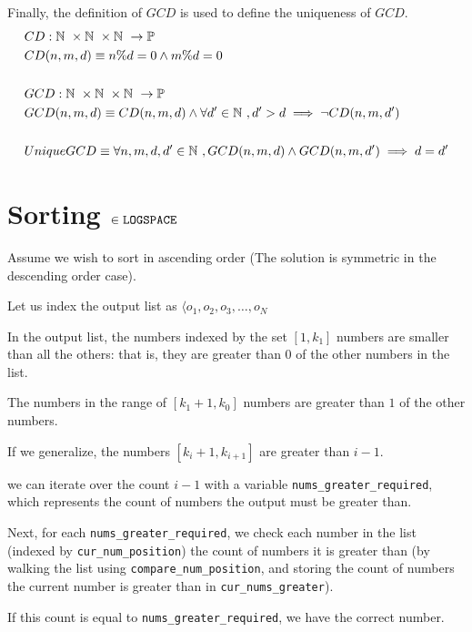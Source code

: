 \documentclass{article}
\begin{document}
Finally, the definition of $GCD$ is used to define the uniqueness of $GCD$.
\begin{align*}
    &CD: \mathbb{N}~ \times \mathbb{N}~ \times \mathbb{N}~ \to \mathbb{P}~ \\
    &CD(n, m, d) \equiv n \% d = 0 \land m \% d = 0
    \\
    \\
    &GCD: \mathbb{N}~ \times \mathbb{N}~ \times \mathbb{N}~ \to \mathbb{P}~ \\
    &GCD(n, m, d) \equiv CD(n, m, d) \land \forall d' \in \mathbb{N}~, d' > d \implies \lnot CD(n, m, d')
    \\
    \\
    &UniqueGCD \equiv \forall n, m, d,  d' \in \mathbb{N}~, GCD(n, m, d) \land GCD(n, m, d') \implies d = d'
\end{align*}

\section{Sorting  $\in \texttt{LOGSPACE}~$}
Assume we wish to sort in ascending order (The solution is symmetric in the
descending order case).


Let us index the output list as $\langle o_1, o_2, o_3, \dots, o_N$

In the output list, the numbers indexed by the set $[1, k_1]$ numbers are smaller
than all the others: that is, they are greater than $0$ of the other numbers in the list.

The numbers in the range of $[k_1 + 1, k_0]$ numbers are greater than $1$ of the
other numbers. 

If we generalize, the numbers $[k_i + 1, k_{i+1}]$ are greater than $i - 1$.

we can iterate over the count $i - 1$ with a variable
\texttt{nums\_greater\_required}, which represents the count of numbers 
the output must be greater than.

Next, for each \texttt{nums\_greater\_required}, we check each number in the list
(indexed by \texttt{cur\_num\_position}) the count of numbers it is greater than
(by walking the list using \texttt{compare\_num\_position}, and storing the count
of numbers the current number is greater than in \texttt{cur\_nums\_greater}).

If this count is equal to \texttt{nums\_greater\_required}, we have the correct
number.
\end{document}
